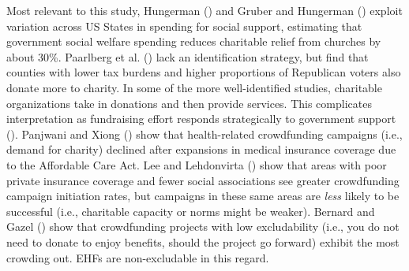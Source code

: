 \documentclass[
  11pt,
  oneside]{article}
\begin{document}
Most relevant to this study, Hungerman () and Gruber and Hungerman () exploit variation across US States in spending for social support, estimating that government social welfare spending reduces charitable relief from churches by about 30\%. Paarlberg et al. () lack an identification strategy, but find that counties with lower tax burdens and higher proportions of Republican voters also donate more to charity. In some of the more well-identified studies, charitable organizations take in donations and then provide services. This complicates interpretation as fundraising effort responds strategically to government support (). Panjwani and Xiong () show that health-related crowdfunding campaigns (i.e., demand for charity) declined after expansions in medical insurance coverage due to the Affordable Care Act. Lee and Lehdonvirta () show that areas with poor private insurance coverage and fewer social associations see greater crowdfunding campaign initiation rates, but campaigns in these same areas are \emph{less} likely to be successful (i.e., charitable capacity or norms might be weaker). Bernard and Gazel () show that crowdfunding projects with low excludability (i.e., you do not need to donate to enjoy benefits, should the project go forward) exhibit the most crowding out. EHFs are non-excludable in this regard.
\end{document}
